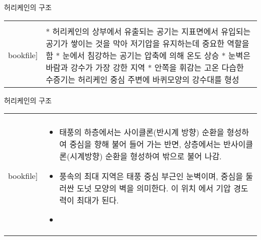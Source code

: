 \begin{frame}[t]{허리케인의 구조}
	\begin{tabular}{ll}
		\begin{minipage}[t]{0.9\textwidth}\scriptsize
			\begin{figure}[t]
				\texttt{[image: \\bookfile]}
			\end{figure}
		\end{minipage}	
		&
		\begin{minipage}[t]{0.05\textwidth} \scriptsize	

			* 허리케인의 상부에서 유출되는 공기는 지표면에서 유입되는 공기가 쌓이는 것을 막아 저기압을 유지하는데 중요한 역할을 함
			* 눈에서 침강하는 공기는 압축에 의해 온도 상승
			* 눈벽은 바람과 강수가 가장 강한 지역
			* 안쪽을 휘감는 고온 다습한 수증기는 허리케인 중심 주변에 바퀴모양의 강수대를 형성 
			
			
		\end{minipage}
	\end{tabular}
\end{frame}

\begin{frame}[t]{허리케인의 구조}
	\begin{tabular}{ll}
		\begin{minipage}[t]{0.6\textwidth}\scriptsize
			\begin{figure}[t]
				\texttt{[image: \\bookfile]}
			\end{figure}
		\end{minipage}	
		&
		\begin{minipage}[t]{0.35\textwidth} \scriptsize	
			\begin{itemize}
				\item 태풍의 하층에서는 사이클론(반시계 방향) 순환을 형성하여 중심을 향해 불어 들어 가는 반면, 상층에서는 반사이클론(시계방향) 순환을 형성하여 밖으로 불어 나감.
				\item  풍속의 최대 지역은 태풍 중심 부근인 눈벽이며, 중심을 둘러싼 도넛 모양의 벽을 의미한다. 
				이 위치 에서 기압 경도력이 최대가 된다.
				
				\item 
			\end{itemize}

		\end{minipage}
	\end{tabular}
\end{frame}


